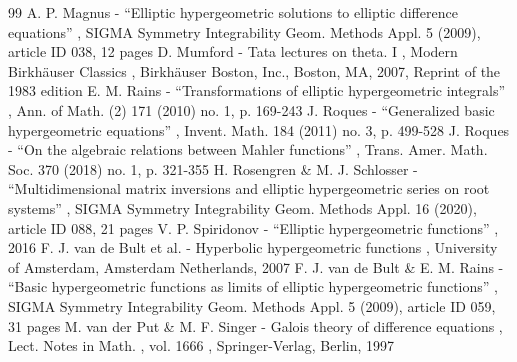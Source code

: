 \documentclass[10pt]{amsart}
\theoremstyle{definition}
\begin{document}
\begin{thebibliography}{99}
 A. P. Magnus - “Elliptic hypergeometric solutions to elliptic difference equations” , SIGMA Symmetry Integrability Geom. Methods Appl. 5 (2009), article ID 038, 12 pages
 D. Mumford - Tata lectures on theta. I , Modern Birkhäuser Classics , Birkhäuser Boston, Inc., Boston, MA, 2007, Reprint of the 1983 edition
 E. M. Rains - “Transformations of elliptic hypergeometric integrals” , Ann. of Math. (2) 171 (2010) no. 1, p. 169-243
 J. Roques - “Generalized basic hypergeometric equations” , Invent. Math. 184 (2011) no. 3, p. 499-528
 J. Roques - “On the algebraic relations between Mahler functions” , Trans. Amer. Math. Soc. 370 (2018) no. 1, p. 321-355
 H. Rosengren \& M. J. Schlosser - “Multidimensional matrix inversions and elliptic hypergeometric series on root systems” , SIGMA Symmetry Integrability Geom. Methods Appl. 16 (2020), article ID 088, 21 pages
 V. P. Spiridonov - “Elliptic hypergeometric functions” , 2016
 F. J. van de Bult et al. - Hyperbolic hypergeometric functions , University of Amsterdam, Amsterdam Netherlands, 2007
 F. J. van de Bult \& E. M. Rains - “Basic hypergeometric functions as limits of elliptic hypergeometric functions” , SIGMA Symmetry Integrability Geom. Methods Appl. 5 (2009), article ID 059, 31 pages
 M. van der Put \& M. F. Singer - Galois theory of difference equations , Lect. Notes in Math. , vol. 1666 , Springer-Verlag, Berlin, 1997
\end{thebibliography}
\end{document}
